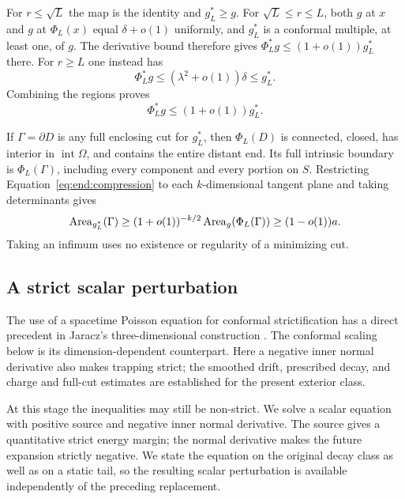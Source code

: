 For $r\le\sqrt L$ the map is the identity and $g_L^*\ge g$.
For $\sqrt L\le r\le L$, both $g$ at $x$ and $g$ at
$\Phi_L(x)$ equal $\delta+o(1)$ uniformly, and $g_L^*$ is
a conformal multiple, at least one, of $g$.
The derivative bound therefore gives
$\Phi_L^*g\le(1+o(1))g_L^*$ there.  For $r\ge L$ one instead
has
\[
 \Phi_L^*g\le(\lambda^2+o(1))\delta\le g_L^*.
\]
Combining the regions proves
\begin{equation}\label{eq:end:compression}
 \Phi_L^*g\le(1+o(1))g_L^*.
\end{equation}

If $\Gamma=\partial D$ is any full enclosing cut for $g_L^*$,
then $\Phi_L(D)$ is connected, closed, has interior in
$\operatorname{int}\Omega$, and contains the entire distant
end.  Its full intrinsic boundary is $\Phi_L(\Gamma)$,
including every component and every portion on $S$.
Restricting Equation~\eqref{eq:end:compression} to each
$k$-dimensional tangent plane and taking determinants gives
\begin{equation}\label{eq:end:all-cut-comparison}
 \operatorname{Area}_{g_L^*}(\Gamma)
 \ge(1+o(1))^{-k/2}\operatorname{Area}_g(\Phi_L(\Gamma))
 \ge(1-o(1))a.
\end{equation}
Taking an infimum uses no existence or regularity of a minimizing
cut.

\subsection{A strict scalar perturbation}

The use of a spacetime Poisson equation for conformal strictification
has a direct precedent in Jaracz's three-dimensional construction
\cite[Theorem~1.1 and Section~3.1, preprint version~1]{Jaracz2025StrictDEC}.
The conformal scaling below is its dimension-dependent counterpart.
Here a negative inner normal derivative also makes trapping strict;
the smoothed drift, prescribed decay, and charge and full-cut estimates
are established for the present exterior class.

At this stage the inequalities may still be non-strict.  We solve a
scalar equation with positive source and negative inner normal
derivative.  The source gives a quantitative strict energy margin;
the normal derivative makes the future expansion strictly negative.
We state the equation on the original decay class as well as on a
static tail, so the resulting scalar perturbation is available
independently of the preceding replacement.

